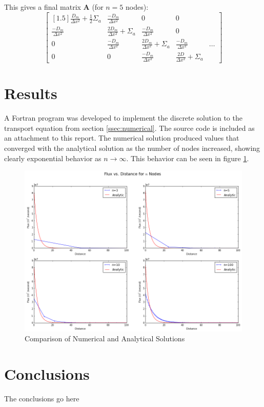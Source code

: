 \documentclass[10pt,peerreviewca]{IEEEtran} %
\newcommand{\opmat}[1]{\mathbf{#1}}
\begin{document}
	This gives a final matrix $\opmat{A}$ (for $n=5$ nodes):
	\[
	\begin{bmatrix}[1.5]
		\frac{D_m}{\Delta x^2} + \frac{1}{2}\Sigma_a & \frac{-D_m}{\Delta x^2} & 0 & 0 \\
		\frac{-D_m}{\Delta x^2} & \frac{2D_m}{\Delta x^2} + \Sigma_a & \frac{-D_m}{\Delta x^2} & 0 \\
		0 & \frac{-D_m}{\Delta x^2} & \frac{2D_m}{\Delta x^2} + \Sigma_a & \frac{-D_m}{\Delta x^2} & \dots \\
		0 & 0 & \frac{-D_m}{\Delta x^2} & \frac{2D}{\Delta x^2} + \Sigma_a
	\end{bmatrix}
	\]

	\section{Results}
	A Fortran program was developed to implement the discrete solution to the transport equation from section \ref{ssec:numerical}. The source code is included as an attachment to this report. The numerical solution produced values that converged with the analytical solution as the number of nodes increased, showing clearly exponential behavior as $n\rightarrow\infty$. This behavior can be seen in figure \ref{fig:numerical_vs_analytical}.

	\begin{figure}
		\includegraphics[width=7in]{analytic_vs_numerical}
		\caption{Comparison of Numerical and Analytical Solutions}
		\label{fig:numerical_vs_analytical}
	\end{figure}
	
	\section{Conclusions}
	The conclusions go here
\end{document}
